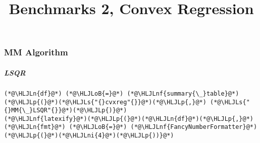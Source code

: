 \documentclass[12pt,a4paper]{article}
\title{ Benchmarks 2, Convex Regression }
\newcommand{\HLJLn}[1]{#1}
\newcommand{\HLJLnf}[1]{\textcolor[RGB]{66,102,213}{#1}}
\newcommand{\HLJLs}[1]{\textcolor[RGB]{201,61,57}{#1}}
\newcommand{\HLJLni}[1]{\textcolor[RGB]{59,151,46}{#1}}
\newcommand{\HLJLoB}[1]{\textcolor[RGB]{102,102,102}{\textbf{#1}}}
\newcommand{\HLJLp}[1]{#1}
\begin{document}
\maketitle


\subsubsection{MM Algorithm}
\subparagraph{LSQR}

\begin{lstlisting}
(*@\HLJLn{df}@*) (*@\HLJLoB{=}@*) (*@\HLJLnf{summary{\_}table}@*)(*@\HLJLp{(}@*)(*@\HLJLs{"{}cvxreg"{}}@*)(*@\HLJLp{,}@*) (*@\HLJLs{"{}MM{\_}LSQR"{}}@*)(*@\HLJLp{)}@*)
(*@\HLJLnf{latexify}@*)(*@\HLJLp{(}@*)(*@\HLJLn{df}@*)(*@\HLJLp{,}@*) (*@\HLJLn{fmt}@*) (*@\HLJLoB{=}@*) (*@\HLJLnf{FancyNumberFormatter}@*)(*@\HLJLp{(}@*)(*@\HLJLni{4}@*)(*@\HLJLp{))}@*)
\end{lstlisting}
\end{document}
